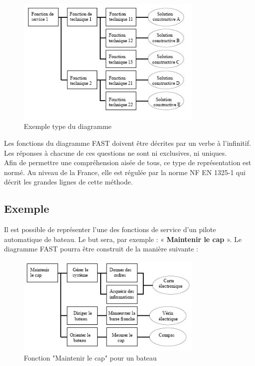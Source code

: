 \documentclass[
	11pt, %
	fleqn, %
	a4paper, %
]{LegrandOrangeBook}
\begin{document}
\begin{figure}[H] %
	\centering %
	\includegraphics[width=0.8\textwidth]{Images/fast1.jpg} %
	\caption{Exemple type du diagramme}
	\label{fast1} %
\end{figure}

Les fonctions du diagramme FAST doivent être décrites par un verbe à l'infinitif. Les réponses à chacune de ces questions ne sont ni exclusives, ni uniques. \\
Afin de permettre une compréhension aisée de tous, ce type de représentation est normé. Au niveau de la France, elle est régulée par la norme NF EN 1325-1 qui décrit les grandes lignes de cette méthode.


\subsection*{Exemple}
Il est possible de représenter l'une des fonctions de service d'un pilote automatique de bateau. Le but sera, par exemple : «\textbf{ Maintenir le cap} ». Le diagramme FAST pourra être construit de la manière suivante :

\begin{figure}[H] %
	\centering %
	\includegraphics[width=0.8\textwidth]{Images/fast2.jpg} %
	\caption{Fonction "Maintenir le cap" pour un bateau}
	\label{fast2} %
\end{figure}
\end{document}
